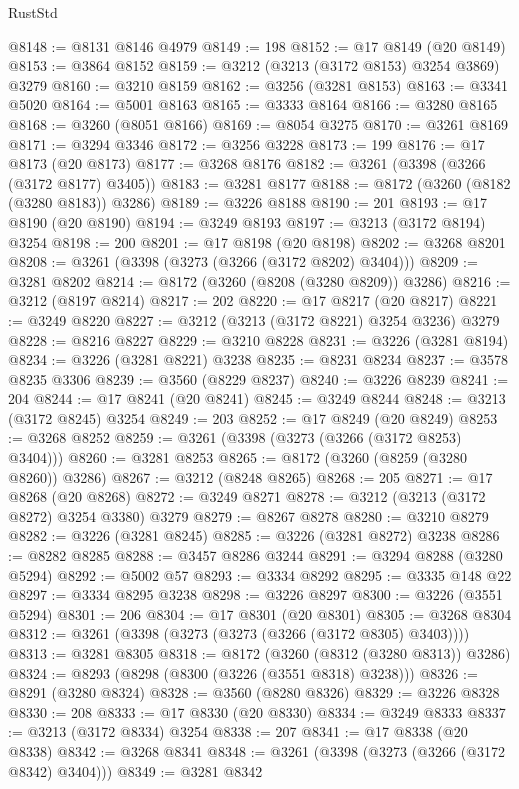 \begin{lexlean}{RustStd}
\begin{coremodule}
@8148 := @8131 @8146 @4979
@8149 := 198
@8152 := @17 @8149 (@20 @8149)
@8153 := @3864 @8152
@8159 := @3212 (@3213 (@3172 @8153) @3254 @3869) @3279
@8160 := @3210 @8159
@8162 := @3256 (@3281 @8153)
@8163 := @3341 @5020
@8164 := @5001 @8163
@8165 := @3333 @8164
@8166 := @3280 @8165
@8168 := @3260 (@8051 @8166)
@8169 := @8054 @3275
@8170 := @3261 @8169
@8171 := @3294 @3346
@8172 := @3256 @3228
@8173 := 199
@8176 := @17 @8173 (@20 @8173)
@8177 := @3268 @8176
@8182 := @3261 (@3398 (@3266 (@3172 @8177) @3405))
@8183 := @3281 @8177
@8188 := @8172 (@3260 (@8182 (@3280 @8183)) @3286)
@8189 := @3226 @8188
@8190 := 201
@8193 := @17 @8190 (@20 @8190)
@8194 := @3249 @8193
@8197 := @3213 (@3172 @8194) @3254
@8198 := 200
@8201 := @17 @8198 (@20 @8198)
@8202 := @3268 @8201
@8208 := @3261 (@3398 (@3273 (@3266 (@3172 @8202) @3404)))
@8209 := @3281 @8202
@8214 := @8172 (@3260 (@8208 (@3280 @8209)) @3286)
@8216 := @3212 (@8197 @8214)
@8217 := 202
@8220 := @17 @8217 (@20 @8217)
@8221 := @3249 @8220
@8227 := @3212 (@3213 (@3172 @8221) @3254 @3236) @3279
@8228 := @8216 @8227
@8229 := @3210 @8228
@8231 := @3226 (@3281 @8194)
@8234 := @3226 (@3281 @8221) @3238
@8235 := @8231 @8234
@8237 := @3578 @8235 @3306
@8239 := @3560 (@8229 @8237)
@8240 := @3226 @8239
@8241 := 204
@8244 := @17 @8241 (@20 @8241)
@8245 := @3249 @8244
@8248 := @3213 (@3172 @8245) @3254
@8249 := 203
@8252 := @17 @8249 (@20 @8249)
@8253 := @3268 @8252
@8259 := @3261 (@3398 (@3273 (@3266 (@3172 @8253) @3404)))
@8260 := @3281 @8253
@8265 := @8172 (@3260 (@8259 (@3280 @8260)) @3286)
@8267 := @3212 (@8248 @8265)
@8268 := 205
@8271 := @17 @8268 (@20 @8268)
@8272 := @3249 @8271
@8278 := @3212 (@3213 (@3172 @8272) @3254 @3380) @3279
@8279 := @8267 @8278
@8280 := @3210 @8279
@8282 := @3226 (@3281 @8245)
@8285 := @3226 (@3281 @8272) @3238
@8286 := @8282 @8285
@8288 := @3457 @8286 @3244
@8291 := @3294 @8288 (@3280 @5294)
@8292 := @5002 @57
@8293 := @3334 @8292
@8295 := @3335 @148 @22
@8297 := @3334 @8295 @3238
@8298 := @3226 @8297
@8300 := @3226 (@3551 @5294)
@8301 := 206
@8304 := @17 @8301 (@20 @8301)
@8305 := @3268 @8304
@8312 := @3261 (@3398 (@3273 (@3273 (@3266 (@3172 @8305) @3403))))
@8313 := @3281 @8305
@8318 := @8172 (@3260 (@8312 (@3280 @8313)) @3286)
@8324 := @8293 (@8298 (@8300 (@3226 (@3551 @8318) @3238)))
@8326 := @8291 (@3280 @8324)
@8328 := @3560 (@8280 @8326)
@8329 := @3226 @8328
@8330 := 208
@8333 := @17 @8330 (@20 @8330)
@8334 := @3249 @8333
@8337 := @3213 (@3172 @8334) @3254
@8338 := 207
@8341 := @17 @8338 (@20 @8338)
@8342 := @3268 @8341
@8348 := @3261 (@3398 (@3273 (@3266 (@3172 @8342) @3404)))
@8349 := @3281 @8342

\end{coremodule}
\end{lexlean}
